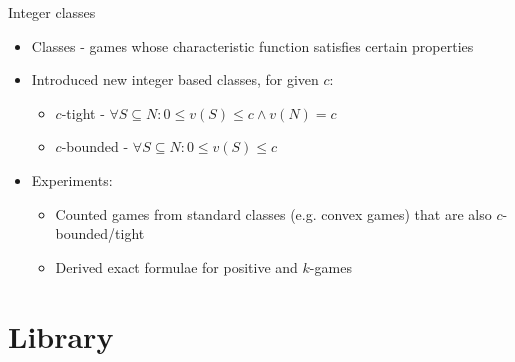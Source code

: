 \documentclass{beamer}
\begin{document}


\begin{frame}{Integer classes}
    \begin{itemize}
        \item Classes - games whose characteristic function satisfies certain properties
        \item Introduced new integer based classes, for given $c$:
        \begin{itemize}
            \item $c$-tight - $\forall S \subseteq N: 0 \leq v(S) \leq c \land v(N) = c$
            \item $c$-bounded - $\forall S \subseteq N: 0 \leq v(S) \leq c$
        \end{itemize}
        \item Experiments:
        \begin{itemize}
            \item Counted games from standard classes (e.g. convex games) that are also $c$-bounded/tight
            \item Derived exact formulae for positive and $k$-games
        \end{itemize}
    \end{itemize}
\end{frame}



\section{Library}

\end{document}
